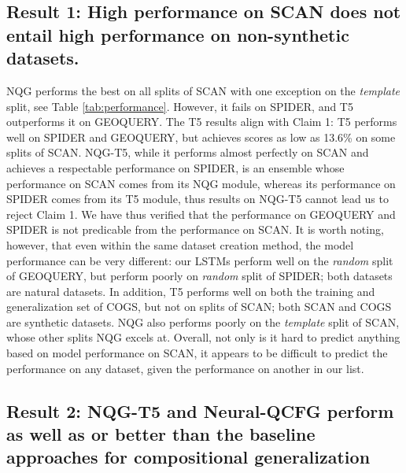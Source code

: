 \subsection{Result 1: High performance on SCAN does not entail high performance on non-synthetic datasets.}
\label{sec:res:perf}
NQG performs the best on all splits of SCAN with one exception on the \textit{template} split, see Table \ref{tab:performance}. However, it fails on SPIDER, and T5 outperforms it on GEOQUERY.
The T5 results align with Claim 1: T5 performs well on SPIDER and GEOQUERY, but achieves scores as low as 13.6\% on some splits of SCAN.
NQG-T5, while it performs almost perfectly on SCAN and achieves a respectable performance on SPIDER, is an ensemble whose performance on SCAN comes from its NQG module, whereas its performance on SPIDER comes from its T5 module, thus results on NQG-T5 cannot lead us to reject Claim 1. 
We have thus verified that the performance on GEOQUERY and SPIDER is not predicable from the performance on SCAN.
%
It is worth noting, however, that even within the same dataset creation method, the model performance can be very different: our LSTMs perform well on the \textit{random} split of GEOQUERY, but perform poorly on \textit{random} split of SPIDER;  both datasets are natural datasets.
In addition, T5 performs well on both the training and generalization set of COGS, but not on splits of SCAN; both SCAN and COGS are synthetic datasets.
NQG also performs poorly on the \textit{template} split of SCAN, whose other splits NQG excels at.
Overall, not only is it hard to predict anything based on model performance on SCAN, it appears to be difficult to predict the performance on any dataset, given the performance on another in our list.

\subsection{Result 2: NQG-T5 and Neural-QCFG perform as well as or better than the baseline approaches for compositional generalization}
\label{sec:res:NQG-NQCFG-perf}
% 


